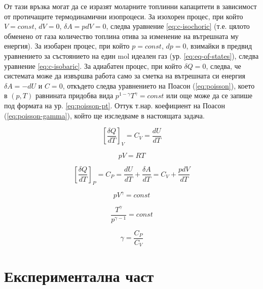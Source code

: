 \documentclass[12pt]{article}
\begin{document}
От тази връзка могат да се изразят моларните топлинни капацитети в зависимост от протичащите термодинамични изопроцеси. За изохорен процес, при който $V = const$, $dV = 0$, $\delta A = pdV = 0$, следва уравнение \ref{eq:c-isochoric} (т.е. цялото обменено от газа количество топлина отива за изменение на вътрешната му енергия). За изобарен процес, при който $p = const$, $dp = 0$, взимайки в предвид уравнението за състоянието на един mol идеален газ (ур. \ref{eq:eq-of-states}), следва уравнение \ref{eq:c-isobaric}. За адиабатен процес, при който $\delta Q = 0$, следва, че системата може да извършва работа само за сметка на вътрешната си енергия $\delta A = -dU$ и $C = 0$, откъдето следва уравнението на Поасон (\ref{eq:poisson}), което в $(p, T)$ равнината придобва вида $p^{1-\gamma}T^\gamma = const$ или още може да се запише под формата на ур. \ref{eq:poisson-pt}. Оттук т.нар. коефициент на Поасон (\ref{eq:poisson-gamma}), който ще изследваме в настоящата задача.

\begin{equation}\label{eq:c-isochoric}
    \left[ \frac{\delta Q}{dT} \right]_V = C_V = \frac{dU}{dT}
\end{equation}

\begin{equation}\label{eq:eq-of-states}
    pV = RT
\end{equation}

\begin{equation}\label{eq:c-isobaric}
    \left[ \frac{\delta Q}{dT} \right]_P = C_P = \frac{dU}{dT} + \frac{\delta A}{dT} = C_V + \frac{pdV}{dT}
\end{equation}

\begin{equation}\label{eq:poisson}
    pV^\gamma = const
\end{equation}

\begin{equation}\label{eq:poisson-pt}
    \frac{T^\gamma}{p^{\gamma - 1}} = const
\end{equation}

\begin{equation}\label{eq:poisson-gamma}
    \gamma = \frac{C_P}{C_V}
\end{equation}

\section{Експериментална част}
\end{document}
